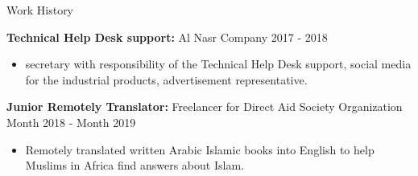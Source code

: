 \documentclass{resume} %
\begin{document}
\begin{rSection}{Work History}
\vspace{-1.25em}
\item \textbf{Technical Help Desk support:} {Al Nasr Company} \hfill 2017 - 2018
  \begin{itemize}
     \itemsep -3pt {} 
      \item  secretary with responsibility of the Technical Help Desk support, social media for the industrial products, advertisement representative.
 \end{itemize}

\item \textbf{Junior Remotely Translator:} {Freelancer for Direct Aid Society Organization} \hfill Month 2018 - Month 2019
  \begin{itemize}
     \itemsep -3pt {} 
      \item  Remotely translated written Arabic Islamic books into English to help Muslims in Africa find answers about Islam.
 \end{itemize}
 
\end{rSection} 

\end{document}
